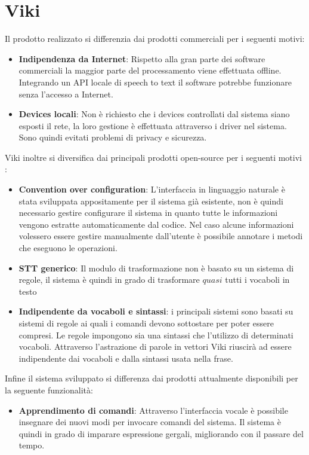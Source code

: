\documentclass[twoside]{supsistudent}
\begin{document}
\section{Viki}
Il prodotto realizzato si differenzia dai prodotti commerciali per i seguenti motivi:
\begin{itemize}
	\item \textbf{Indipendenza da Internet}: Rispetto alla gran parte dei software commerciali la maggior parte del processamento viene effettuata offline. Integrando un API locale di speech to text il software potrebbe funzionare senza l'accesso a Internet.
	\item \textbf{Devices locali}: Non è richiesto che i devices controllati dal sistema siano esposti il rete, la loro gestione è effettuata attraverso i driver nel sistema. Sono quindi evitati problemi di privacy e sicurezza.
\end{itemize}
Viki inoltre si diversifica dai principali prodotti open-source per i seguenti motivi :
\begin{itemize}
	\item \textbf{Convention over configuration}: L'interfaccia in linguaggio naturale è stata sviluppata appositamente per il sistema già esistente, non è quindi necessario gestire configurare il sistema in quanto tutte le informazioni vengono estratte automaticamente dal codice. Nel caso alcune informazioni volessero essere gestire manualmente dall'utente è possibile annotare i metodi che eseguono le operazioni.
	\item \textbf{STT generico}: Il modulo di trasformazione non è basato su un sistema di regole, il sistema è quindi in grado di trasformare \(quasi\) tutti i vocaboli in testo
	\item \textbf{Indipendente da vocaboli e sintassi}: i principali sistemi sono basati su sistemi di regole ai quali i comandi devono sottostare per poter essere compresi. Le regole impongono sia una sintassi che l'utilizzo di determinati vocaboli. Attraverso l'astrazione di parole in vettori Viki riuscirà ad essere indipendente dai vocaboli e dalla sintassi usata nella frase.
\end{itemize}
Infine il sistema sviluppato si differenza dai prodotti attualmente disponibili per la seguente funzionalità:
\begin{itemize}
	\item \textbf{Apprendimento di comandi}: Attraverso l'interfaccia vocale è possibile insegnare dei nuovi modi per invocare comandi del sistema. Il sistema è quindi in grado di imparare espressione gergali, migliorando con il passare del tempo.
\end{itemize}
\end{document}
